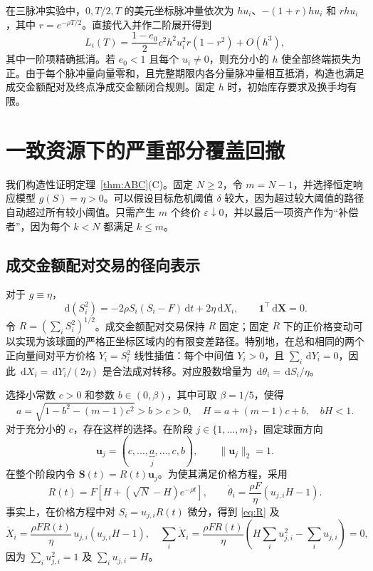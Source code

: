 \documentclass[11pt]{article}
\numberwithin{equation}{section}
\theoremstyle{definition}
\theoremstyle{remark}
\newcommand{\dd}{\,\mathrm{d}}
\newcommand{\one}{\mathbf{1}}
\begin{document}
在三脉冲实验中，$0,T/2,T$ 的美元坐标脉冲量依次为 $hu_i$、$-(1+r)hu_i$ 和 $rhu_i$，其中 $r=e^{-\rho T/2}$。直接代入并作二阶展开得到
\begin{equation}\label{eq:local-three}
L_i(T)=\frac{1-e_0}{2}c^2h^2u_i^2r(1-r^2)+O(h^3),
\end{equation}
其中一阶项精确抵消。若 $e_0<1$ 且每个 $u_i\ne0$，则充分小的 $h$ 使全部终端损失为正。由于每个脉冲量向量零和，且完整期限内各分量脉冲量相互抵消，构造也满足成交金额配对及终点净成交金额闭合规则。固定 $h$ 时，初始库存要求及换手均有限。

\section{一致资源下的严重部分覆盖回撤}\label{app:severe}
我们构造性证明定理~\ref{thm:ABC}(C)。固定 $N\ge2$，令 $m=N-1$，并选择恒定响应模型 $g(S)=\eta>0$。可以假设目标危机阈值 $\delta$ 较大，因为超过较大阈值的路径自动超过所有较小阈值。只需产生 $m$ 个终价 $\varepsilon\downarrow0$，并以最后一项资产作为“补偿者”，因为每个 $k<N$ 都满足 $k\le m$。

\subsection{成交金额配对交易的径向表示}
对于 $g\equiv\eta$，
\begin{equation}\label{eq:radius-appendix}
\dd(S_i^2)= -2\rho S_i(S_i-F)\dd t+2\eta\dd X_i,
\qquad \one^\top\dd\bm X=0.
\end{equation}
令 $R=(\sum_iS_i^2)^{1/2}$。成交金额配对交易保持 $R$ 固定；固定 $R$ 下的正价格变动可以实现为该球面的严格正坐标区域内的有限变差路径。特别地，在总和相同的两个正向量间对平方价格 $Y_i=S_i^2$ 线性插值：每个中间值 $Y_i>0$，且 $\sum_i\dd Y_i=0$，因此 $\dd X_i=\dd Y_i/(2\eta)$ 是合法成对转移。对应股数增量为 $\dd\theta_i=\dd S_i/\eta$。

选择小常数 $c>0$ 和参数 $b\in(0,\beta)$，其中可取 $\beta=1/5$，使得
\begin{equation}\label{eq:abcs}
a=\sqrt{1-b^2-(m-1)c^2}>b>c>0,
\quad
H=a+(m-1)c+b,
\quad bH<1.
\end{equation}
对于充分小的 $c$，存在这样的选择。在阶段 $j\in\{1,\dots,m\}$，固定球面方向
\begin{equation}\label{eq:uj}
\bm u_j=(c,\ldots,\underbrace{a}_{j},\ldots,c,b),
\qquad \|\bm u_j\|_2=1.
\end{equation}
在整个阶段内令 $\bm S(t)=R(t)\bm u_j$。为使其满足价格方程，采用
\begin{equation}\label{eq:R}
R(t)=F\left[H+(\sqrt N-H)e^{-\rho t}\right],
\qquad
\dot\theta_i=\frac{\rho F}{\eta}\left(u_{j,i}H-1\right).
\end{equation}
事实上，在价格方程中对 $S_i=u_{j,i}R(t)$ 微分，得到 \eqref{eq:R} 及
\begin{equation}\label{eq:dXdt}
\dot X_i=\frac{\rho FR(t)}\eta\,u_{j,i}(u_{j,i}H-1),
\quad \sum_i\dot X_i=\frac{\rho FR(t)}\eta\left(H\sum_i u_{j,i}^2-\sum_i u_{j,i}\right)=0,
\end{equation}
因为 $\sum_i u_{j,i}^2=1$ 及 $\sum_i u_{j,i}=H$。
\end{document}
